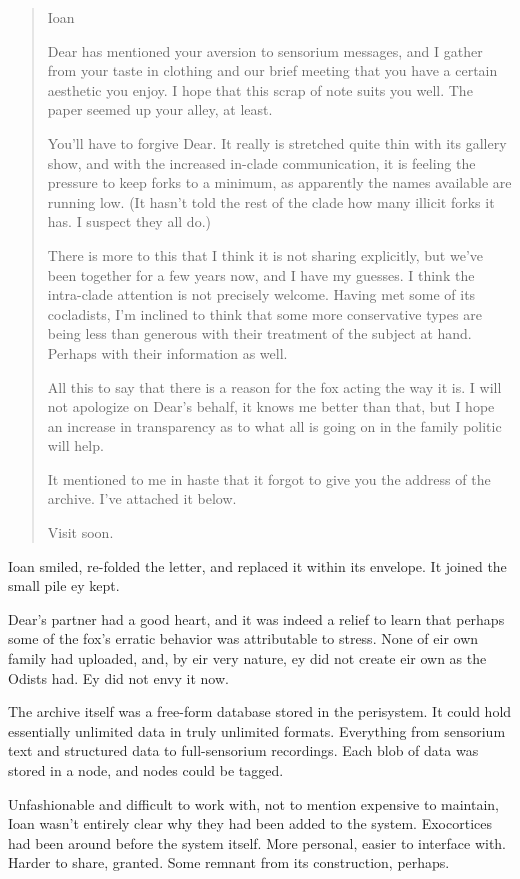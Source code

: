\begin{quote}
Ioan

Dear has mentioned your aversion to sensorium messages, and I gather from your taste in clothing and our brief meeting that you have a certain aesthetic you enjoy. I hope that this scrap of note suits you well. The paper seemed up your alley, at least.

You'll have to forgive Dear. It really is stretched quite thin with its gallery show, and with the increased in-clade communication, it is feeling the pressure to keep forks to a minimum, as apparently the names available are running low. (It hasn't told the rest of the clade how many illicit forks it has. I suspect they all do.)

There is more to this that I think it is not sharing explicitly, but we've been together for a few years now, and I have my guesses. I think the intra-clade attention is not precisely welcome. Having met some of its cocladists, I'm inclined to think that some more conservative types are being less than generous with their treatment of the subject at hand. Perhaps with their information as well.

All this to say that there is a reason for the fox acting the way it is. I will not apologize on Dear's behalf, it knows me better than that, but I hope an increase in transparency as to what all is going on in the family politic will help.

It mentioned to me in haste that it forgot to give you the address of the archive. I've attached it below.

Visit soon.
\end{quote}

Ioan smiled, re-folded the letter, and replaced it within its envelope. It joined the small pile ey kept.

Dear's partner had a good heart, and it was indeed a relief to learn that perhaps some of the fox's erratic behavior was attributable to stress. None of eir own family had uploaded, and, by eir very nature, ey did not create eir own as the Odists had. Ey did not envy it now.

The archive itself was a free-form database stored in the perisystem. It could hold essentially unlimited data in truly unlimited formats. Everything from sensorium text and structured data to full-sensorium recordings. Each blob of data was stored in a node, and nodes could be tagged.

Unfashionable and difficult to work with, not to mention expensive to maintain, Ioan wasn't entirely clear why they had been added to the system. Exocortices had been around before the system itself. More personal, easier to interface with. Harder to share, granted. Some remnant from its construction, perhaps.

